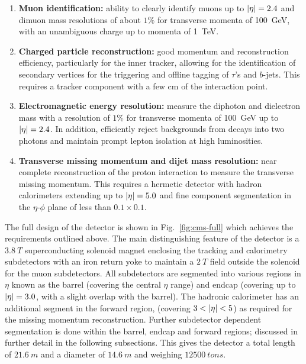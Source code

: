 \begin{enumerate}
    \item \textbf{Muon identification:} ability to clearly identify muons up to $|\eta|=2.4$ and dimuon mass resolutions of about $1\%$ for transverse momenta of \SI{100}{GeV}, with an unambiguous charge up to momenta of \SI{1}{TeV}.
    \item \textbf{Charged particle reconstruction:} good momentum and reconstruction efficiency, particularly for the inner tracker, allowing for the identification of secondary vertices for the triggering and offline tagging of $\tau$'s and $b$-jets. This requires a tracker component with a few cm of the interaction point.
    \item \textbf{Electromagnetic energy resolution:} measure the diphoton and dielectron mass with a resolution of $1\%$ for transverse momenta of \SI{100}{GeV} up to $|\eta|=2.4$. In addition, efficiently reject backgrounds from \Ppizero decays into two photons and maintain prompt lepton isolation at high luminosities.
    \item \textbf{Transverse missing momentum and dijet mass resolution:} near complete reconstruction of the proton interaction to measure the transverse missing momentum. This requires a hermetic detector with hadron calorimeters extending up to $|\eta|=5.0$ and fine component segmentation in the $\eta$-$\phi$ plane of less than $0.1\times 0.1$.
\end{enumerate}

The full design of the \CMS detector is shown in Fig.~\ref{fig:cms-full} which achieves the requirements outlined above. The main distinguishing feature of the \CMS detector is a ${\SI{3.8}{T}}$ superconducting solenoid magnet enclosing the tracking and calorimetry subdetectors with an iron return yoke to maintain a ${\SI{2}{T}}$ field outside the solenoid for the muon subdetectors. All subdetectors are segmented into various regions in $\eta$ known as the barrel (covering the central $\eta$ range) and endcap (covering up to $|\eta|=3.0$, with a slight overlap with the barrel). The hadronic calorimeter has an additional segment in the forward region, (covering $3<\aeta<5$) as required for the missing momentum reconstruction. Further subdetector dependent segmentation is done within the barrel, endcap and forward regions; discussed in further detail in the following subsections.  This gives the \CMS detector a total length of ${\SI{21.6}{m}}$ and a diameter of ${\SI{14.6}{m}}$ and weighing ${\SI{12500}{tons}}$.

